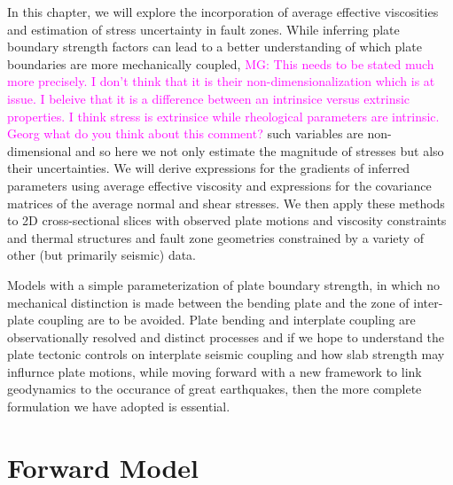 \documentclass[12pt]{article}
\newcommand{\mgnote}[1]{\textcolor{magenta}{MG: #1}}
\begin{document}
In this chapter, we will explore the incorporation of average effective viscosities and estimation of stress uncertainty in fault zones. While inferring plate boundary strength factors \citep{ratnaswamy2015adjoint} can lead to a better understanding of which plate boundaries are more mechanically coupled, \mgnote{This needs to be stated much more precisely. I don't think that it is their non-dimensionalization which is at issue. I beleive that it is a difference between an intrinsice versus extrinsic properties. I think stress is extrinsice while rheological parameters are intrinsic. Georg what do you think about this comment?} such variables are non-dimensional and so here we not only estimate the magnitude of  stresses but also their uncertainties. We will derive expressions for the gradients of inferred parameters using average effective viscosity and expressions for the covariance matrices of the average normal and shear stresses. We then apply these methods to 2D cross-sectional slices with observed plate motions and viscosity constraints and thermal structures and fault zone geometries constrained by a variety of other (but primarily seismic) data.

Models with a simple parameterization of plate boundary strength, 
in which no mechanical distinction is made between the bending plate and the
zone of inter-plate coupling are to be avoided.
Plate bending and interplate coupling are observationally
resolved and distinct processes and if we hope to understand the
plate tectonic controls on interplate seismic coupling
and how slab strength may influrnce plate motions, while moving forward
with a new framework to link geodynamics to the occurance of great
earthquakes, then the more complete
formulation we have adopted is essential.
 
\section{Forward Model}
\end{document}
